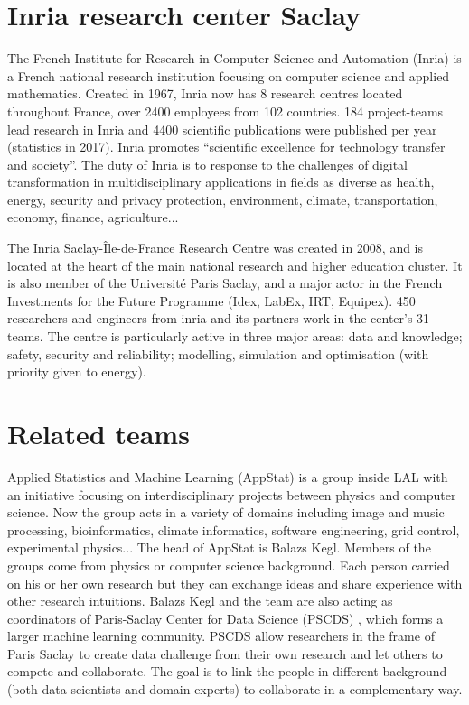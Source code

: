 \section{Inria research center Saclay}
The French Institute for Research in Computer Science and Automation (Inria) is a French national research institution focusing on computer science and applied mathematics. Created in 1967, Inria now has 8 research centres located throughout France, over 2400 employees from 102 countries. 184 project-teams lead research in Inria and 4400 scientific publications were published per year (statistics in 2017)\cite{inria_statistics}. Inria promotes “scientific excellence for technology transfer and society”. The duty of Inria is to response to the challenges of digital transformation in multidisciplinary applications in fields as diverse as health, energy, security and privacy protection, environment, climate, transportation, economy, finance, agriculture...

The Inria Saclay-Île-de-France Research Centre was created in 2008, and is located at the heart of the main national research and higher education cluster. It is also member of the Université Paris Saclay, and a major actor in the French Investments for the Future Programme (Idex, LabEx, IRT, Equipex). 450 researchers and engineers from inria and its partners work in the center's 31 teams. The centre is particularly active in three major areas: data and knowledge; safety, security and reliability; modelling, simulation and optimisation (with priority given to energy)\cite{inria_overview}.

\section{Related teams}
\label{teams}
Applied Statistics and Machine Learning (AppStat) is a group inside LAL with an initiative focusing on interdisciplinary projects between physics and computer science. Now the group acts in a variety of domains including image and music processing, bioinformatics, climate informatics, software engineering, grid control, experimental physics... The head of AppStat is Balazs Kegl. Members of the groups come from physics or computer science background. Each person carried on his or her own research but they can exchange ideas and share experience with other research intuitions. Balazs Kegl and the team are also acting as coordinators of Paris-Saclay Center for Data Science (PSCDS) , which forms a larger machine learning community. PSCDS allow researchers in the frame of Paris Saclay to create data challenge from their own research and let others to compete and collaborate. The goal is to link the people in different background (both data scientists and domain experts) to collaborate in a complementary way\cite{balazs-kegl}.  

